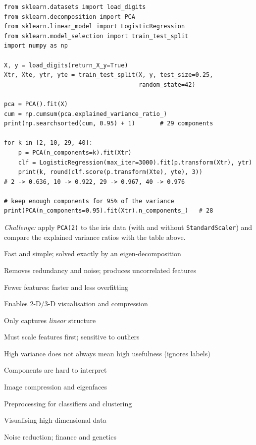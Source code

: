 \begin{tryit}
\begin{lstlisting}
from sklearn.datasets import load_digits
from sklearn.decomposition import PCA
from sklearn.linear_model import LogisticRegression
from sklearn.model_selection import train_test_split
import numpy as np

X, y = load_digits(return_X_y=True)
Xtr, Xte, ytr, yte = train_test_split(X, y, test_size=0.25,
                                      random_state=42)

pca = PCA().fit(X)
cum = np.cumsum(pca.explained_variance_ratio_)
print(np.searchsorted(cum, 0.95) + 1)       # 29 components

for k in [2, 10, 29, 40]:
    p = PCA(n_components=k).fit(Xtr)
    clf = LogisticRegression(max_iter=3000).fit(p.transform(Xtr), ytr)
    print(k, round(clf.score(p.transform(Xte), yte), 3))
# 2 -> 0.636, 10 -> 0.922, 29 -> 0.967, 40 -> 0.976

# keep enough components for 95% of the variance
print(PCA(n_components=0.95).fit(Xtr).n_components_)   # 28
\end{lstlisting}
\emph{Challenge:} apply \texttt{PCA(2)} to the iris data (with and without \texttt{StandardScaler}) and compare the explained variance ratios with the table above.
\end{tryit}

{\item Fast and simple; solved exactly by an eigen-decomposition
 \item Removes redundancy and noise; produces uncorrelated features
 \item Fewer features: faster and less overfitting
 \item Enables 2-D/3-D visualisation and compression}
{\item Only captures \emph{linear} structure
 \item Must scale features first; sensitive to outliers
 \item High variance does not always mean high usefulness (ignores labels)
 \item Components are hard to interpret}
{\item Image compression and eigenfaces
 \item Preprocessing for classifiers and clustering
 \item Visualising high-dimensional data
 \item Noise reduction; finance and genetics}

